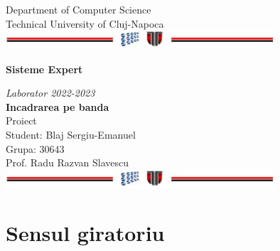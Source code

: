 \documentclass[a4paper,12pt]{report}
\begin{document}
\vspace{-5cm}
\begin{center}
Department of Computer Science\\
Technical University of Cluj-Napoca\\
\includegraphics[width=10cm]{fig/footer}
\end{center}
\vspace{1cm}
\begin{center}
\begin{Large}
\textbf{Sisteme Expert}\\
\end{Large}
\textit{Laborator 2022-2023}\\
\vspace{3cm}
\textbf{Incadrarea pe banda}\\
Proiect\\
\vspace{1.5cm}
Student: Blaj Sergiu-Emanuel\\
Grupa: 30643\\
\vspace{6cm}
Prof. Radu Razvan Slavescu\\
\vspace{1cm}
\includegraphics[width=10cm]{fig/footer}
\end{center}

\tableofcontents

%

\newpage

\chapter{Sensul giratoriu}
\end{document}
